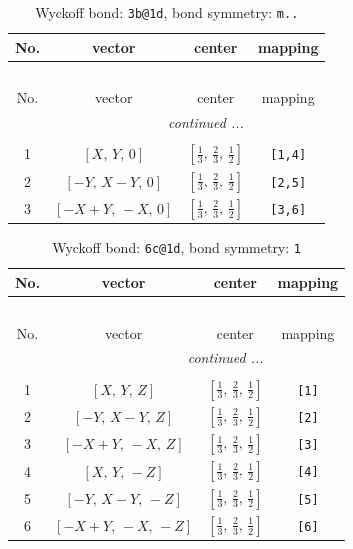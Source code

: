 \documentclass[fleqn,8pt]{jsarticle}
\begin{document}
\renewcommand{\arraystretch}{1.2}
\begin{longtable}{cccc}
\caption{Wyckoff bond: {\tt 3b@1d}, bond symmetry: {\tt m..}}
 \\
 \hline \hline
No. & vector & center & mapping \\ \hline \endfirsthead

\multicolumn{3}{l}{\tablename\ \thetable{}} \\
 \hline \hline
No. & vector & center & mapping \\ \hline \endhead

 \hline \hline
\multicolumn{3}{r}{\footnotesize\it continued ...} \\ \endfoot

 \hline \hline
\multicolumn{3}{r}{} \\ \endlastfoot

1 & $\left[ X,\, Y,\, 0 \right]$ & $\left[ \frac{1}{3},\, \frac{2}{3},\, \frac{1}{2} \right]$ & {\tt [1,4]} \\ \hline
2 & $\left[ - Y,\, X - Y,\, 0 \right]$ & $\left[ \frac{1}{3},\, \frac{2}{3},\, \frac{1}{2} \right]$ & {\tt [2,5]} \\ \hline
3 & $\left[ - X + Y,\, - X,\, 0 \right]$ & $\left[ \frac{1}{3},\, \frac{2}{3},\, \frac{1}{2} \right]$ & {\tt [3,6]} \\
\end{longtable}
\renewcommand{\arraystretch}{1.2}
\begin{longtable}{cccc}
\caption{Wyckoff bond: {\tt 6c@1d}, bond symmetry: {\tt 1}}
 \\
 \hline \hline
No. & vector & center & mapping \\ \hline \endfirsthead

\multicolumn{3}{l}{\tablename\ \thetable{}} \\
 \hline \hline
No. & vector & center & mapping \\ \hline \endhead

 \hline \hline
\multicolumn{3}{r}{\footnotesize\it continued ...} \\ \endfoot

 \hline \hline
\multicolumn{3}{r}{} \\ \endlastfoot

1 & $\left[ X,\, Y,\, Z \right]$ & $\left[ \frac{1}{3},\, \frac{2}{3},\, \frac{1}{2} \right]$ & {\tt [1]} \\ \hline
2 & $\left[ - Y,\, X - Y,\, Z \right]$ & $\left[ \frac{1}{3},\, \frac{2}{3},\, \frac{1}{2} \right]$ & {\tt [2]} \\ \hline
3 & $\left[ - X + Y,\, - X,\, Z \right]$ & $\left[ \frac{1}{3},\, \frac{2}{3},\, \frac{1}{2} \right]$ & {\tt [3]} \\ \hline
4 & $\left[ X,\, Y,\, - Z \right]$ & $\left[ \frac{1}{3},\, \frac{2}{3},\, \frac{1}{2} \right]$ & {\tt [4]} \\ \hline
5 & $\left[ - Y,\, X - Y,\, - Z \right]$ & $\left[ \frac{1}{3},\, \frac{2}{3},\, \frac{1}{2} \right]$ & {\tt [5]} \\ \hline
6 & $\left[ - X + Y,\, - X,\, - Z \right]$ & $\left[ \frac{1}{3},\, \frac{2}{3},\, \frac{1}{2} \right]$ & {\tt [6]} \\
\end{longtable}
\end{document}
